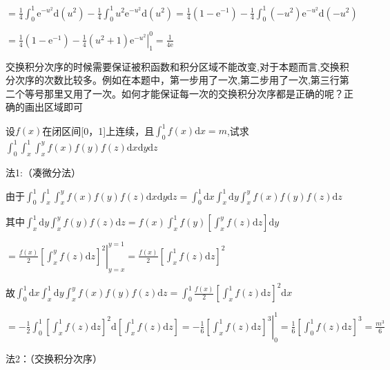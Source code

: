 \begin{xiti}
\begin{solution}
		$= \frac{1}{4} \int_{0}^{1} \mathrm{e}^{-u^{2}} \mathrm{d} \left(u^{2}\right)-\frac{1}{4} \int_{0}^{1} u^{2} \mathrm{e}^{-u^{2}} \mathrm{d} \left(u^{2}\right) = \frac{1}{4}\left(1-\mathrm{e}^{-1}\right)-\frac{1}{4} \int_{0}^{1}\left(-u^{2}\right) \mathrm{e}^{-u^{2}} \mathrm{d} \left(-u^{2}\right)$
		
		$= \frac{1}{4}\left(1-\mathrm{e}^{-1}\right)-\frac{1}{4}\left(u^{2}+1\right)\left.\mathrm{e}^{-u^{2}}\right|_{1} ^{0} = \frac{1}{4 \mathrm{e}}$
		
		\begin{note}
			交换积分次序的时候需要保证被积函数和积分区域不能改变,对于本题而言,交换积分次序的次数比较多。例如在本题中，第一步用了一次,第二步用了一次,第三行第二个等号那里又用了一次。如何才能保证每一次的交换积分次序都是正确的呢？正确的画出区域即可
		\end{note}
	\end{solution}
	
	\item 设$f(x)$在闭区间[0，1]上连续，且$\int_{0}^{1} f(x)  \mathrm{d} x =m$,试求$\int_{0}^{1} \int_{x}^{1} \int_{x}^{y} f(x) f(y) f(z) \mathrm{d} x \mathrm{d} y \mathrm{d} z$
	\begin{solution}
		法1:（凑微分法）
		
		由于$\int_{0}^{1} \int_{x}^{1} \int_{x}^{y} f(x) f(y) f(z) \mathrm{d} x \mathrm{d} y \mathrm{d} z = \int_{0}^{1} \mathrm{d} x \int_{x}^{1} \mathrm{d} y \int_{x}^{y} f(x) f(y) f(z) \mathrm{d} z $
		
		其中$\int_{x}^{1} \mathrm{d} y \int_{x}^{y} f(y) f(z) \mathrm{d} z = f(x) \int_{x}^{1} f(y) \left[ \int_{x}^{y} f(z) \mathrm{d} z \right] \mathrm{d} y$
		
		$ = \frac{f(x)}{2} \left. \left[ \int_{x}^{y} f(z) \mathrm{d} z \right]^{2} \right|_{y=x}^{y=1} =\frac{f(x)}{2} \left[ \int_{x}^{1} f(z) \mathrm{d} z \right]^{2} $
		
		故$\int_{0}^{1} \mathrm{d} x \int_{x}^{1} \mathrm{d} y \int_{x}^{y} f(x) f(y) f(z) \mathrm{d} z = \int_{0}^{1} \frac{f(x)}{2} \left[ \int_{x}^{1} f(z) \mathrm{d} z \right]^{2} \mathrm{d} x $
		
		$= -\frac{1}{2} \int_{0}^{1} \left[ \int_{x}^{1} f(z) \mathrm{d} z \right]^{2} \mathrm{d} \left[ \int_{x}^{1} f(z) \mathrm{d} z \right] = -\frac{1}{6} \left. \left[ \int_{x}^{1} f(z) \mathrm{d} z \right]^{3} \right|_{0}^{1} = \frac{1}{6} \left[ \int_{0}^{1} f(z) \mathrm{d} z \right]^{3} = \frac{ m^{3} }{6}$
		
		法2：（交换积分次序）
		

\end{solution}
\end{xiti}
